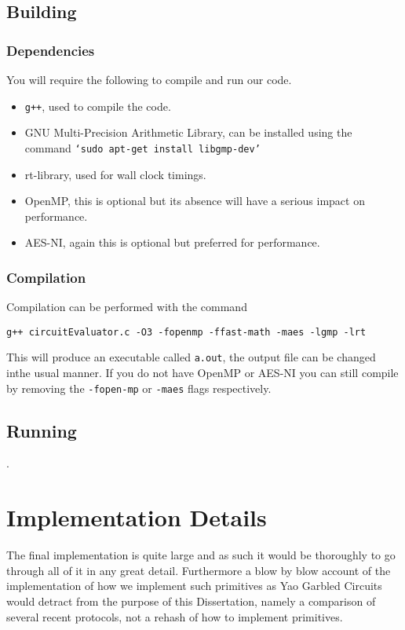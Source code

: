 \documentclass[ %
                    author={Nicholas Tutte},
                supervisor={Prof. Nigel Smart},
                    degree={MEng},
                     title={Secure Two Party Computation},
                  subtitle={A practical comparison of recent protocols},
                      type={Research - GG1K},
                      year={2015} ]{dissertation}
\begin{document}
\begin{appendices}
			\section{Building}
				\subsection{Dependencies}
					You will require the following to compile and run our code.

					\begin{itemize}
						\item \texttt{g++}, used to compile the code.
						\item GNU Multi-Precision Arithmetic Library, can be installed using the command \texttt{`sudo apt-get install libgmp-dev'}
						\item rt-library, used for wall clock timings.
						\item OpenMP, this is optional but its absence will have a serious impact on performance.
						\item AES-NI, again this is optional but preferred for performance.
					\end{itemize}

				\subsection{Compilation}
					Compilation can be performed with the command
					\begin{center}
						\texttt{g++ circuitEvaluator.c -O3 -fopenmp -ffast-math -maes -lgmp -lrt}
					\end{center}

					This will produce an executable called \texttt{a.out}, the output file can be changed inthe usual manner. If you do not have OpenMP or AES-NI you can still compile by removing the \texttt{-fopen-mp} or \texttt{-maes} flags respectively.


			\section{Running}
				.

		
		\chapter{Implementation Details} \label{sec:ImplementationDetails}
			The final implementation is quite large and as such it would be thoroughly to go through all of it in any great detail. Furthermore a blow by blow account of the implementation of how we implement such primitives as Yao Garbled Circuits would detract from the purpose of this Dissertation, namely a comparison of several recent protocols, not a rehash of how to implement primitives.\\


\end{appendices}
\end{document}
